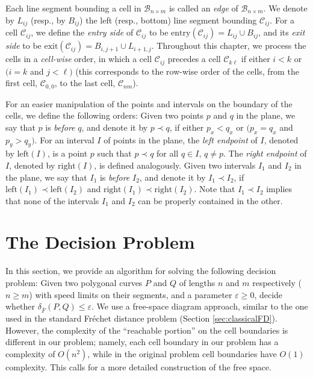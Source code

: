 \documentclass[12pt]{dalthesis}
\newcommand{\lee}{\leqslant}
\newcommand{\gee}{\geqslant}
\newcommand{\eps}{\varepsilon}
\newcommand{\CF}{{\mathscr F}}
\newcommand{\CB}{{\mathscr B}}
\newcommand{\CC}{{\mathscr C}}
\newcommand{\Frechet}{Fr\'echet }
\newcommand{\distFS}{\delta_{\bar{F}}} \newcommand{\distWeakF}{\delta_{\bar{N}}} \newcommand{\distClosedF}{\delta_{\bar{C}}} \newcommand{\distPartialF}{\delta_{\bar{P}}} \newcommand{\distGrpahF}{\delta_{\bar{G}}} \newcommand{\distDisF}{\delta_{dF}} \newcommand{\distGeoF}{\delta_{\hat{F}}} \newcommand{\distHomF}{\delta_{h}} \newcommand{\distC}{\delta_C} \newcommand{\distSetF}{\delta_{\CF}}
\newcommand{\cell}[1]{{\CC_{#1}}}
\newcommand{\BNM}{\CB_{n \times m}}
\newcommand{\entry}[1]{\mbox{entry}(\cell{#1})}
\newcommand{\exit}[1]{\mbox{exit}(\cell{#1})}
\newcommand{\Left}{\mbox{left}}
\newcommand{\Right}{\mbox{right}}
\newcommand{\lei}{\prec}
\begin{document}
Each line segment bounding a cell in $\BNM$ is called an {\em edge\/} of $\BNM$.
We denote by $L_{ij}$ (resp., by $B_{ij}$) the left (resp., bottom) line segment bounding $\cell{ij}$.
For a cell $\cell{ij}$, we define the {\em entry side\/} of $\cell{ij}$ to be $\entry{ij} = L_{ij} \cup B_{ij}$,
and its {\em exit side\/} to be $\exit{ij} = B_{i,j+1} \cup L_{i+1,j}$.
Throughout this chapter, we process the cells in a {\em cell-wise\/} order,
in which a cell $\cell{ij}$ precedes a cell $\cell{k\ell}$ if either $i<k$
or $(i=k$  and $j<\ell)$ (this corresponds to the row-wise order of the cells,
from the first cell, $\cell{0,0}$, to the last cell, $\cell{nm}$). 

For an easier manipulation of the points and intervals on the boundary of the cells,
we define the following orders:
Given two points $p$ and $q$ in the plane, we say that 
$p$ is {\em before\/} $q$, and denote it by $p \lei q$, if either $p_x < q_x$ or $(p_x = q_x $  and  $ p_y > q_y)$.
For an interval $I$ of points in the plane, the {\em left endpoint\/} of $I$, denoted by $\Left(I)$,
is a point $p$ such that $p \lei q$ for all $q \in I$, $q \not= p$.
The {\em right endpoint\/} of $I$, denoted by $\Right(I)$, is defined analogously.
Given two intervals $I_1$ and $I_2$ in the plane,
we say that $I_1$ is {\em before\/} $I_2$, and denote it by $I_1 \lei I_2$, if
$\Left(I_1) \lei \Left(I_2)$ and $\Right(I_1) \lei \Right(I_2)$.
Note that  $I_1 \lei I_2$ implies that none of the intervals $I_1$ and $I_2$
can be properly contained in the other.







\section{The Decision Problem} \label{sec:decisionSpeed}

In this section, we provide an algorithm for solving the following decision problem:
Given two polygonal curves $P$ and $Q$ of lengths $n$ and $m$ respectively ($n \gee m$)
with speed limits on their segments, 
and a parameter $\eps \gee 0$,
decide whether $\distFS(P,Q) \lee \eps$.
We use a free-space diagram approach, similar to the one used in the standard \Frechet distance problem (Section \ref{sec:classicalFD}).
However, the complexity of the ``reachable portion'' on the cell boundaries is different 
in our problem; namely, each cell boundary in our problem has a complexity of $O(n^2)$,
while in the original problem cell boundaries have $O(1)$ complexity. 
This calls for a more detailed construction of the free space. 
\end{document}
